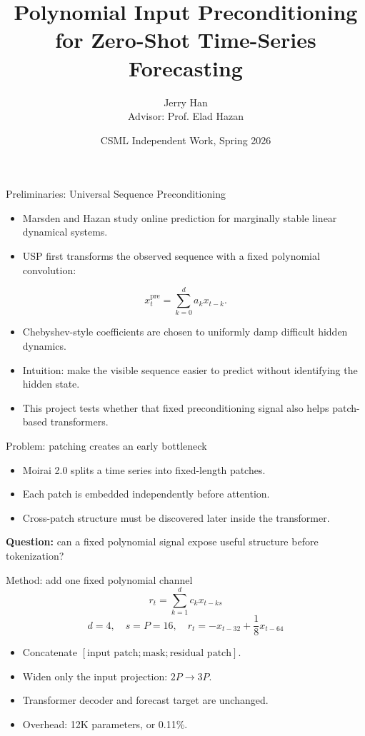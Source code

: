 \documentclass[aspectratio=169]{beamer}
\title{Polynomial Input Preconditioning for Zero-Shot Time-Series Forecasting}
\author{Jerry Han\\Advisor: Prof. Elad Hazan}
\institute{Program in Statistics and Machine Learning\\Princeton University}
\date{CSML Independent Work, Spring 2026}
\begin{document}
\begin{frame}
  \titlepage
\end{frame}

\begin{frame}{Preliminaries: Universal Sequence Preconditioning}
\large
\begin{itemize}
  \item Marsden and Hazan study online prediction for marginally stable linear dynamical systems.
  \item USP first transforms the observed sequence with a fixed polynomial convolution:
\end{itemize}
\[
  x^{\mathrm{pre}}_t = \sum_{k=0}^{d} a_k x_{t-k}.
\]
\begin{itemize}
  \item Chebyshev-style coefficients are chosen to uniformly damp difficult hidden dynamics.
  \item Intuition: make the visible sequence easier to predict without identifying the hidden state.
  \item This project tests whether that fixed preconditioning signal also helps patch-based transformers.
\end{itemize}
\end{frame}

\begin{frame}{Problem: patching creates an early bottleneck}
\large
\begin{itemize}
  \item Moirai 2.0 splits a time series into fixed-length patches.
  \item Each patch is embedded independently before attention.
  \item Cross-patch structure must be discovered later inside the transformer.
\end{itemize}
\vspace{0.25in}
\begin{center}
\textbf{Question:} can a fixed polynomial signal expose useful structure before tokenization?
\end{center}
\end{frame}

\begin{frame}{Method: add one fixed polynomial channel}
\large
\[
  r_t = \sum_{k=1}^{d} c_k x_{t-ks}
\]
\[
  d=4,\quad s=P=16,\quad r_t=-x_{t-32}+\frac{1}{8}x_{t-64}
\]
\vspace{0.08in}
\begin{itemize}
  \item Concatenate $[\text{input patch};\text{mask};\text{residual patch}]$.
  \item Widen only the input projection: $2P \to 3P$.
  \item Transformer decoder and forecast target are unchanged.
  \item Overhead: 12K parameters, or 0.11\%.
\end{itemize}
\end{frame}
\end{document}
